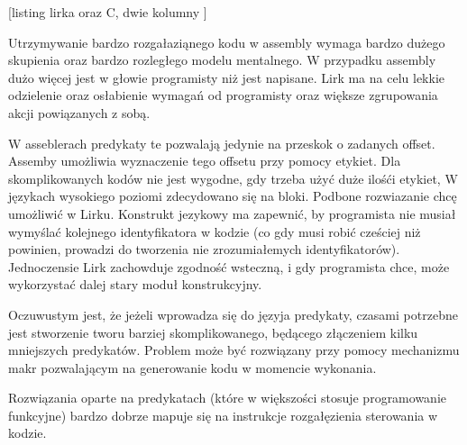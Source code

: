 \documentclass[11pt]{article}
\begin{document}
[listing lirka oraz C, dwie kolumny ]

Utrzymywanie bardzo rozgałaziąnego kodu w assembly wymaga bardzo dużego skupienia oraz bardzo rozległego modelu mentalnego. W przypadku assembly dużo więcej jest w głowie programisty niż jest napisane.
Lirk ma na celu lekkie odzielenie oraz osłabienie wymagań od programisty oraz większe zgrupowania akcji powiązanych z sobą.

W asseblerach predykaty te pozwalają jedynie na przeskok o zadanych offset. Assemby umożliwia wyznaczenie tego offsetu przy pomocy etykiet. Dla skomplikowanych kodów nie jest wygodne, gdy trzeba użyć duże ilośći etykiet, W językach wysokiego poziomi zdecydowano się na bloki. Podbone rozwiazanie chcę umożliwić w Lirku. Konstrukt jezykowy ma zapewnić, by programista nie musiał wymyślać kolejnego identyfikatora w kodzie (co gdy musi robić cześciej niż powinien, prowadzi do tworzenia nie zrozumiałemych identyfikatorów). Jednoczensie Lirk zachowduje zgodność wsteczną, i gdy programista chce, może wykorzystać dalej stary moduł konstrukcyjny. 

Oczuwustym jest, że jeżeli wprowadza się do języja predykaty, czasami potrzebne jest stworzenie tworu barziej skomplikowanego, będącego złączeniem kilku mniejszych predykatów. Problem może być rozwiązany przy pomocy mechanizmu makr pozwalającym na generowanie kodu w momencie wykonania. 

Rozwiązania oparte na predykatach (które w większości stosuje programowanie funkcyjne) bardzo dobrze mapuje się na instrukcje rozgałęzienia sterowania w kodzie.  
\end{document}
